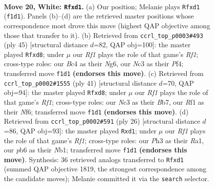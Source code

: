 \documentclass[11pt]{article}
\begin{document}
\clearpage

\begin{figure}[p]\centering
\begin{subfigure}{0.46\textwidth}\centering
\resizebox{\linewidth}{!}{%
\newchessgame
\chessboard[
  setfen={rnb1k2r/5p2/1p2p3/p3P1p1/P1B5/2N4P/1P3PP1/R2q1RK1 w q - 0 20},
  showmover=false,
  pgfstyle=straightmove, color=movearrow, markmove={f1-d1}
]}
\caption{}
\end{subfigure}\hfill
\begin{subfigure}{0.46\textwidth}\centering
\resizebox{\linewidth}{!}{%
\newchessgame
\chessboard[
  setfen={r2Q1rk1/2p2pp1/1p4np/pP6/5p2/1PP3NP/2P2PP1/3RR1K1 b - - 0 23},
  showmover=false,
  pgfstyle=straightmove, color=movearrow, markmove={f8-d8}
]}
\caption{}
\end{subfigure}
\\[4pt]
\begin{subfigure}{0.46\textwidth}\centering
\resizebox{\linewidth}{!}{%
\newchessgame
\chessboard[
  setfen={r2Q1rk1/1b3pp1/4pn1p/p7/1p1P4/3BP2P/1P1B1PP1/R3R1K1 b - - 0 21},
  showmover=false,
  pgfstyle=straightmove, color=movearrow, markmove={f8-d8}
]}
\caption{}
\end{subfigure}\hfill
\begin{subfigure}{0.46\textwidth}\centering
\resizebox{\linewidth}{!}{%
\newchessgame
\chessboard[
  setfen={r1b1k2r/ppp1P1pp/8/b3n3/8/1Bp5/P4PPP/RNBq1RK1 w - - 0 14},
  showmover=false,
  pgfstyle=straightmove, color=movearrow, markmove={f1-d1}
]}
\caption{}
\end{subfigure}
\caption{\textbf{Move 20, White: \texttt{Rfxd1}.} (a) Our position; Melanie plays \texttt{Rfxd1} (\texttt{f1d1}). Panels (b)--(d) are the retrieved master positions whose correspondence most drove this move (highest QAP objective among those that transfer to it). (b) Retrieved from \texttt{ccrl\_top\_p0003\#493} (ply 45) [structural distance $d$=82, QAP obj=100]: the master played \texttt{Rfxd8}; under $\mu$ our \emph{Rf1} plays the role of that game's \emph{Rf1}; cross-type roles: our \emph{B}c4 as their \emph{N}g6, our \emph{N}c3 as their \emph{P}f4; transferred move \texttt{f1d1} \textbf{(endorses this move)}. (c) Retrieved from \texttt{ccrl\_top\_p0002\#1555} (ply 41) [structural distance $d$=70, QAP obj=94]: the master played \texttt{Rfxd8}; under $\mu$ our \emph{Rf1} plays the role of that game's \emph{Rf1}; cross-type roles: our \emph{N}c3 as their \emph{B}b7, our \emph{R}f1 as their \emph{N}f6; transferred move \texttt{f1d1} \textbf{(endorses this move)}. (d) Retrieved from \texttt{ccrl\_top\_p0002\#591} (ply 26) [structural distance $d$=86, QAP obj=93]: the master played \texttt{Rxd1}; under $\mu$ our \emph{Rf1} plays the role of that game's \emph{Rf1}; cross-type roles: our \emph{P}h3 as their \emph{R}a1, our \emph{p}b6 as their \emph{N}b1; transferred move \texttt{f1d1} \textbf{(endorses this move)}. Synthesis: 36 retrieved analogs transferred to \texttt{Rfxd1} (summed QAP objective 1819, the strongest correspondence among the candidate moves); Melanie committed it via the \texttt{search} selector.}
\label{fig:thought-m38}
\end{figure}
\end{document}
